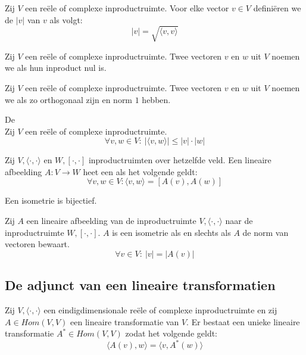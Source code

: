 \documentclass[main.tex]{subfiles}
\begin{document}
\begin{de}
  Zij $V$ een re\"ele of complexe inproductruimte.
  Voor elke vector $v\in V$ defini\"eren we de  $|v|$ van $v$ als volgt:
  \[ |v| = \sqrt{\langle v,v\rangle} \]
\end{de}

\begin{de}
  Zij $V$ een re\"ele of complexe inproductruimte.
  Twee vectoren $v$ en $w$ uit $V$ noemen we  als hun inproduct nul is.
\end{de}

\begin{de}
  Zij $V$ een re\"ele of complexe inproductruimte.
  Twee vectoren $v$ en $w$ uit $V$ noemen we  als zo orthogonaal zijn en norm $1$ hebben.
\end{de}

\begin{st}
  De \\
  Zij $V$ een re\"ele of complexe inproductruimte.
  \[ \forall v,w \in V:\ |\langle v,w \rangle| \le |v| \cdot |w| \]
\end{st}

\begin{de}
  Zij $V,\langle\cdot,\cdot\rangle$ en $W,[\cdot,\cdot]$ inproductruimten over hetzelfde veld.
  Een lineaire afbeelding $A:V \rightarrow W$ heet een  als het volgende geldt:
  \[ \forall v,w \in V: \langle v,w \rangle =[A(v),A(w)] \]
\end{de}

\begin{ei}
  Een isometrie is bijectief.
\end{ei}

\begin{ei}
  Zij $A$ een lineaire afbeelding van de inproductruimte $V,\langle\cdot,\cdot\rangle$ naar de inproductruimte $W,[\cdot,\cdot]$.
  $A$ is een isometrie als en slechts als $A$ de norm van vectoren bewaart.
  \[ \forall v \in V:\ |v| = |A(v)| \]
\end{ei}

\subsection{De adjunct van een lineaire transformatien}
\label{sec:de-adjunct-van}

\begin{st}
  \examen
  Zij $V,\langle\cdot,\cdot\rangle$ een eindigdimensionale re\"ele of complexe inproductruimte en zij $A\in Hom(V,V)$ een lineaire transformatie van $V$.
  Er bestaat een unieke lineaire transformatie $A^{*} \in Hom(V,V)$ zodat het volgende geldt:
  \[ \langle A(v),w \rangle = \langle v, A^{*}(w) \rangle \]
\end{st}
\end{document}
